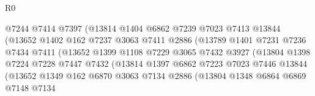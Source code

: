 \begin{lexlean}{R0}
\begin{coremodule}
                                @7244
                                @7414
                                @7397
                                (@13814
                                  @1404
                                  @6862
                                  @7239
                                  @7023
                                  @7413
                                  @13844
                                  (@13652
                                    @1402
                                    @162
                                    @7237
                                    @3063
                                    @7411
                                    @2886
                                    (@13789
                                      @1401
                                      @7231
                                      @7236
                                      @7434
                                      @7411
                                      (@13652
                                        @1399
                                        @1108
                                        @7229
                                        @3065
                                        @7432
                                        @3927
                                        (@13804
                                          @1398
                                          @7224
                                          @7228
                                          @7447
                                          @7432
                                          (@13814
                                            @1397
                                            @6862
                                            @7223
                                            @7023
                                            @7446
                                            @13844
                                            (@13652
                                              @1349
                                              @162
                                              @6870
                                              @3063
                                              @7134
                                              @2886
                                              (@13804
                                                @1348
                                                @6864
                                                @6869
                                                @7148
                                                @7134

\end{coremodule}
\end{lexlean}
